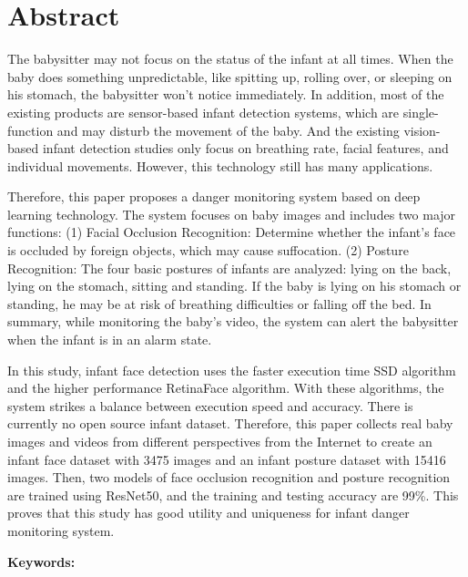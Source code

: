 \documentclass[class=NCU_thesis, crop=false]{standalone}
\begin{document}
\chapter{Abstract}
The babysitter may not focus on the status of the infant at all times. 
When the baby does something unpredictable, like spitting up, rolling over, or sleeping on his stomach, 
the babysitter won't notice immediately.
In addition, most of the existing products are sensor-based infant detection systems, 
which are single-function and may disturb the movement of the baby.
And the existing vision-based infant detection studies only focus on breathing rate, facial features, and individual movements.
However, this technology still has many applications.

Therefore, this paper proposes a danger monitoring system based on deep learning technology.
The system focuses on baby images and includes two major functions:
(1) Facial Occlusion Recognition: Determine whether the infant's face is occluded by foreign objects, which may cause suffocation.
(2) Posture Recognition: The four basic postures of infants are analyzed: lying on the back, lying on the stomach, sitting and standing.
If the baby is lying on his stomach or standing, he may be at risk of breathing difficulties or falling off the bed.
In summary, while monitoring the baby's video, the system can alert the babysitter when the infant is in an alarm state.

In this study, infant face detection uses the faster execution time SSD algorithm and the higher performance RetinaFace algorithm.
With these algorithms, the system strikes a balance between execution speed and accuracy.
There is currently no open source infant dataset.
Therefore, this paper collects real baby images and videos from different perspectives from the Internet to create an infant face dataset with 3475 images and an infant posture dataset with 15416 images.
Then, two models of face occlusion recognition and posture recognition are trained using ResNet50, 
and the training and testing accuracy are 99\%.
This proves that this study has good utility and uniqueness for infant danger monitoring system.

\vspace{2em}
\noindent \textbf{Keywords:} \keywordsEn{} %
\end{document}
